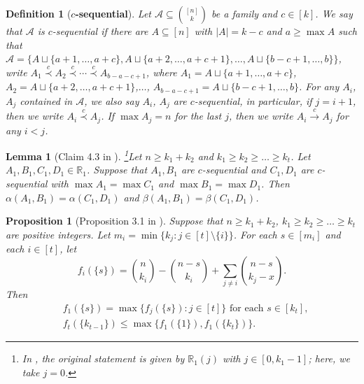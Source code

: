 \documentclass[a4paper,11pt]{article}
\newtheorem{definition}[theorem]{Definition}
\newtheorem{lemma}[theorem]{Lemma}
\newtheorem{proposition}[theorem]{Proposition}
\begin{document}
\begin{definition}[{\bf $c$-sequential}]\label{def3.14}
Let $\mathcal{A}\subseteq {[n]\choose k}$ be a family and $c\in [k]$. We say that $\mathcal{A}$ is $c$-{\it sequential} if there are $A\subseteq [n]$ with $|A|=k-c$ and $a\geq \max A$ such that $\mathcal{A}=\{A\sqcup \{a+1, \dots, a+c\}, A\sqcup \{a+2, \dots, a+c+1\}, \dots, A\sqcup \{b-c+1, \dots, b\}\}$,  write $A_1\overset{c}{\prec} A_2\overset{c}{\prec}\cdots\overset{c}{\prec}A_{b-a-c+1}$, where $A_1=A\sqcup \{a+1, \dots, a+c\}$, $A_2=A\sqcup \{a+2, \dots, a+c+1\}$,$\dots$, $A_{b-a-c+1}=A\sqcup \{b-c+1, \dots, b\}$.
 For any $A_i$,  $A_j$ contained in $\mathcal{A}$, we also say $A_i$, $ A_j$ are $c$-sequential,
 in particular, if $j=i+1$, then we write $A_{i}\overset{c}{\prec}  A_{j}$. If  $\max A_{j}=n$ for the last $j$, then we write $A_{i}\overset{c}{\longrightarrow}  A_{j}$ for any $i<j$.
 \end{definition}


\begin{lemma}[Claim 4.3 in \cite{HP+}]\footnote{In \cite{HP+}, the original statement is given by $\mathbb{R}_1(j)$ with $j\in [0, k_1-1]$; here, we take $j=0$. }\label{clm27-}
Let $n\geq k_1+k_2$ and $k_1\geq k_2\geq \dots \geq k_t$.
Let %
$A_1, B_1, C_1, D_1\in \mathbb{R}_1$.
Suppose that $A_1, B_1$ are $c$-sequential and  $C_1, D_1$ are $c$-sequential with $\max A_1=\max C_1$ and $\max B_1=\max D_1$. Then $\alpha(A_1, B_1)=\alpha(C_1, D_1)$ and
$\beta(A_1, B_1)=\beta(C_1, D_1)$.
\end{lemma}







\begin{proposition}[Proposition 3.1 in \cite{HP+}]\label{7-17-2}
Suppose that $n\geq k_1+k_2 $, $k_1\geq k_2\geq \dots \geq k_t$ are positive integers. Let $m_i=\min \{k_j: j\in [t]\setminus \{i\}\}$.
For each $s\in [m_i]$ and each $i\in [t]$, let
\[
f_i(\{s\})={n\choose k_i}-{n-s\choose k_i}+\sum_{j\ne i}{n-s\choose k_j-x}.
\]
Then
\begin{align*}
&f_1(\{s\})=\max \{f_j(\{s\}): j\in [t]\} \text{ for each } s\in [k_t],\\
&f_t(\{k_{t-1}\})\leq \max \{f_1(\{1\}), f_1(\{k_t\})\}.
\end{align*}
\end{proposition}
\end{document}
